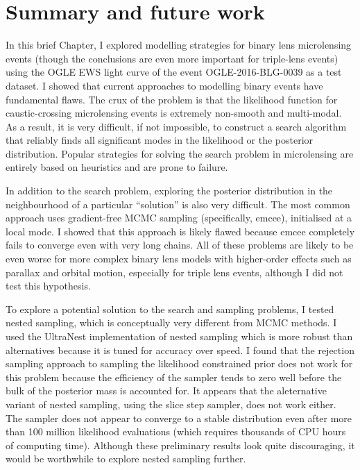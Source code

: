 \documentclass[12pt,dvipsnames]{report}
\newcommand{\ssf}[1]{\textsf{#1}}
\begin{document}
\section{Summary and future work}
In this brief Chapter, I explored modelling strategies for binary lens microlensing events
(though the conclusions are even more important for triple-lens events)
using the OGLE EWS light curve of the event OGLE-2016-BLG-0039 as a test dataset. 
I showed that current approaches to modelling binary events have fundamental flaws. 
The crux of the problem is that the likelihood function for caustic-crossing microlensing 
events is extremely non-smooth and multi-modal. As a result, 
it is very difficult, if not impossible, to construct a search algorithm that reliably 
finds all significant modes in the likelihood or the posterior distribution. 
Popular strategies for solving the search problem in microlensing are entirely based on heuristics 
and are prone to failure. 

In addition to the search problem, exploring the 
posterior distribution in the neighbourhood of a particular ``solution'' is also very difficult.
The most common approach uses  gradient-free MCMC sampling (specifically, \ssf{emcee}),
initialised at a local mode.
I showed that this approach is likely flawed because \ssf{emcee} completely fails to converge even 
with very long chains. 
All of these problems are likely to be even worse for more complex binary lens models 
with higher-order effects such as parallax and orbital motion, especially for triple 
lens events, although I did not test this hypothesis.

To explore a potential solution to the search and sampling problems, I tested nested sampling,
which is conceptually very different from MCMC methods.
I used the \ssf{UltraNest} implementation of nested sampling which 
is more robust than alternatives because it is tuned for accuracy over speed.
I found that the rejection sampling approach to sampling the likelihood constrained prior 
does not work for this problem because the efficiency of the sampler tends to zero well 
before the bulk of the posterior mass is accounted for.
It appears that the aleternative variant of nested sampling, using the slice step sampler,
does not work either.
The sampler does not appear to converge to a stable distribution even
after more than 100 million likelihood evaluations (which requires thousands of CPU 
hours of computing time). Although these preliminary results look quite discouraging,
it would be worthwhile to explore nested sampling further. 
\end{document}
